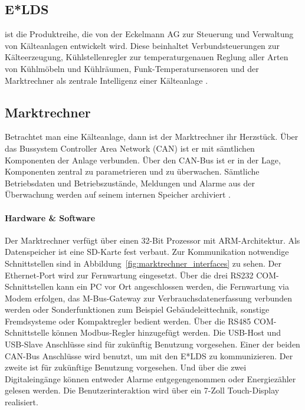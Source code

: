 \documentclass[11pt,a4paper]{report}
\begin{document}

\subsection{E*LDS} ist die Produktreihe, die von der Eckelmann AG zur Steuerung und Verwaltung von Kälteanlagen entwickelt wird. Diese beinhaltet Verbundsteuerungen zur Kälteerzeugung, Kühlstellenregler zur temperaturgenauen Reglung aller Arten von Kühlmöbeln und Kühlräumen, Funk-Temperatursensoren und der Marktrechner als zentrale Intelligenz einer Kälteanlage \cite{elds}.

\subsection{Marktrechner} \label{sec:marktrechner} 
Betrachtet man eine Kälteanlage, dann ist der Marktrechner ihr Herzstück. Über das Bussystem Controller Area Network (CAN) ist er mit sämtlichen Komponenten der Anlage verbunden. Über den CAN-Bus ist er in der Lage, Komponenten zentral zu parametrieren und zu überwachen. Sämtliche Betriebsdaten und Betriebszustände, Meldungen und Alarme aus der Überwachung werden auf seinem internen Speicher archiviert \cite{elds}.

\paragraph{Hardware \& Software} Der Marktrechner verfügt über einen 32-Bit Prozessor mit ARM-Architektur. Als Datenspeicher ist eine SD-Karte fest verbaut. Zur Kommunikation notwendige Schnittstellen sind in Abbildung~\ref{fig:marktrechner_interfaces} zu sehen. Der Ethernet-Port wird zur Fernwartung eingesetzt. Über die drei RS232 COM-Schnittstellen kann ein PC vor Ort angeschlossen werden, die Fernwartung via Modem erfolgen, das M-Bus-Gateway zur Verbrauchsdatenerfassung verbunden werden oder Sonderfunktionen zum Beispiel Gebäudeleittechnik, sonstige Fremdsysteme oder Kompaktregler bedient werden. Über die RS485 COM-Schnittstelle können Modbus-Regler hinzugefügt werden. Die USB-Host und USB-Slave Anschlüsse sind für zukünftig Benutzung vorgesehen. Einer der beiden CAN-Bus Anschlüsse wird benutzt, um mit den E*LDS zu kommunizieren. Der zweite ist für zukünftige Benutzung vorgesehen. Und über die zwei Digitaleingänge können entweder Alarme entgegengenommen oder Energiezähler gelesen werden. Die Benutzerinteraktion wird über ein 7-Zoll Touch-Display realisiert.
\end{document}
